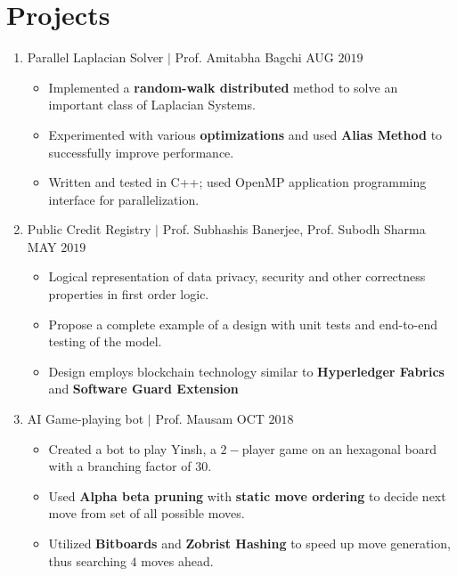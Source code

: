 \documentclass{article}
\begin{document}
\section*{Projects}
\begin{enumerate}
\item
    Parallel Laplacian Solver
    $\mid$
    Prof. Amitabha Bagchi
    \hfill
    AUG $2019$

    \begin{itemize}[noitemsep,nolistsep]
        \item
            Implemented a \textbf{random-walk distributed} method to solve an
            important class of Laplacian Systems.
        \item
            Experimented with various \textbf{optimizations} and used
            \textbf{Alias Method} to successfully improve performance.
        \item
            Written and tested in C++; used OpenMP application programming
            interface for parallelization.
    \end{itemize}

\item
    Public Credit Registry
    $\mid$
    Prof. Subhashis Banerjee, Prof. Subodh Sharma
    \hfill
    MAY $2019$

    \begin{itemize}[noitemsep,nolistsep]
        \item
            Logical representation of data privacy, security and other
            correctness properties in first order logic.
        \item
            Propose a complete example of a design with unit tests and
            end-to-end testing of the model.
        \item
            Design employs blockchain technology similar to \textbf{Hyperledger
            Fabrics} and \textbf{Software Guard Extension}
    \end{itemize}

\item
    AI Game-playing bot
    $\mid$
    Prof. Mausam
    \hfill
    OCT $2018$

    \begin{itemize}[noitemsep,nolistsep]
        \item
            Created a bot to play Yinsh, a $2-$player game on an hexagonal board
            with a branching factor of $30$.
        \item
            Used \textbf{Alpha beta pruning} with \textbf{static move ordering}
            to decide next move from set of all possible moves.
        \item
            Utilized \textbf{Bitboards} and \textbf{Zobrist Hashing} to speed up
            move generation, thus searching $4$ moves ahead.
    \end{itemize}


\end{enumerate}
\end{document}
